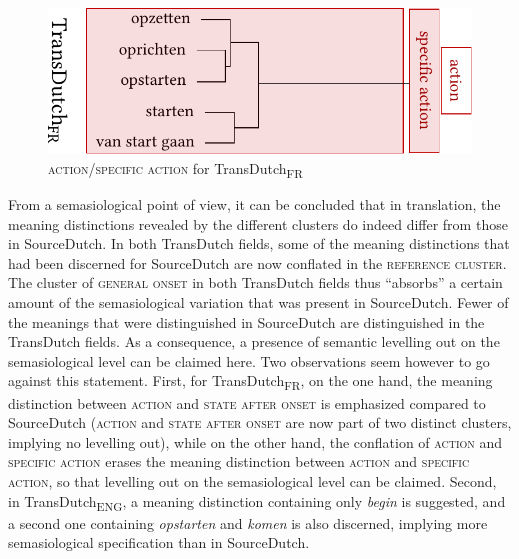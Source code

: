\begin{figure}
\includegraphics[width=.66\textwidth]{figures/tree89.pdf}
\caption{\label{fig:4:86}\textsc{action}/\textsc{specific} \textsc{action} for TransDutch\textsubscript{FR}}
\end{figure}

From a semasiological point of view, it can be concluded that in translation, the meaning distinctions revealed by the different clusters do indeed differ from those in SourceDutch. In both TransDutch fields, some of the meaning distinctions that had been discerned for SourceDutch are now conflated in the \textsc{reference cluster}. The cluster of \textsc{general onset} in both TransDutch fields thus ``absorbs'' a certain amount of the semasiological variation that was present in SourceDutch. Fewer of the meanings that were distinguished in SourceDutch are distinguished in the TransDutch fields. As a consequence, a presence of semantic levelling out on the semasiological level can be claimed here. Two observations seem however to go against this statement. First, for TransDutch\textsubscript{FR}, on the one hand, the meaning distinction between \textsc{action} and \textsc{state after onset} is emphasized compared to SourceDutch (\textsc{action} and \textsc{state after onset} are now part of two distinct clusters, implying no levelling out), while on the other hand, the conflation of \textsc{action} and {\textsc{specific}} \textsc{action} erases the meaning distinction between \textsc{action} and {\textsc{specific}} \textsc{action}, so that levelling out on the semasiological level can be claimed. Second, in TransDutch\textsubscript{ENG}, a meaning distinction containing only \textit{begin} is suggested, and a second one containing \textit{opstarten} and \textit{komen} is also discerned, implying more semasiological specification than in SourceDutch.

